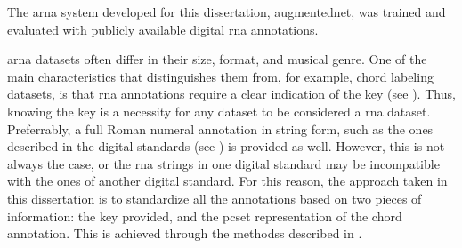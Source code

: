 
The \gls{arna} system developed for this dissertation,
\gls{augmentednet}, was trained and evaluated with publicly
available digital \gls{rna} annotations. 

\gls{arna} datasets often  differ in their size, format, and
musical genre. One of the main characteristics that
distinguishes them from, for example, chord labeling
datasets, is that \gls{rna} annotations require a clear
indication of the key (see ). Thus,
knowing the key is a necessity for any dataset to be
considered a \gls{rna} dataset. Preferrably, a full Roman
numeral annotation in string form, such as the ones
described in the digital standards (see
) is provided as well.
However, this is not always the case, or the \gls{rna}
strings in one digital standard may be incompatible with the
ones of another digital standard. For this reason, the
approach taken in this dissertation is to standardize all
the annotations based on two pieces of information: the key
provided, and the \gls{pcset} representation of the chord
annotation. This is achieved through the methodss described
in .


